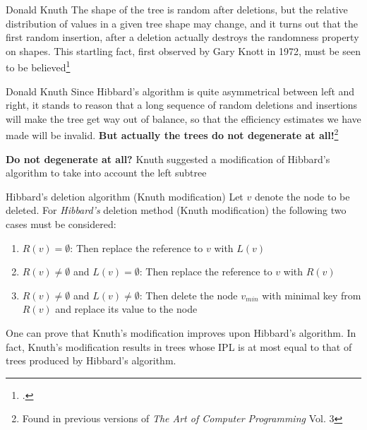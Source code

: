 \documentclass{beamer}
\begin{document}
\begin{frame}
    \begin{block}{Donald Knuth}
        The shape of the tree is random after deletions, but the relative distribution of values in a given tree shape may change, and it turns out that the first random insertion, after a deletion actually destroys the randomness property on shapes. This startling fact, first observed by Gary Knott in 1972, must be seen to be believed\footcite{knuth1998art}
    \end{block}

    \pause
    \begin{block}{Donald Knuth}
        Since Hibbard's algorithm is quite asymmetrical between left and right, it stands to reason that a long sequence of random deletions and insertions will make the tree get way out of balance, so that the efficiency estimates we have made will be invalid. \textbf{But actually the trees do not degenerate at all!}\footnote{Found in previous versions of \textit{The Art of Computer Programming} Vol. 3}
    \end{block}
\end{frame}

\begin{frame}
    \textbf{Do not degenerate at all?}
    \pause
    Knuth suggested a modification of Hibbard's algorithm to take into account the left subtree
    \begin{block}{Hibbard's deletion algorithm (Knuth modification)}
        Let $v$ denote the node to be deleted. For \textit{Hibbard's} deletion method (Knuth modification) the following two cases must be considered:
        \begin{enumerate}
            \item $R(v) = \emptyset$: Then replace the reference to $v$ with $L(v)$
            \item $R(v) \neq \emptyset$ and $L(v) = \emptyset$: Then replace the reference to $v$ with $R(v)$
            \item $R(v) \neq \emptyset$ and $L(v) \neq \emptyset$: Then delete the node $v_{min}$ with minimal key from $R(v)$ and replace its value to the node
        \end{enumerate}
    \end{block}
    \pause
    One can prove that Knuth's modification improves upon Hibbard's algorithm. In fact, Knuth's modification results in trees whose IPL is at most equal to that of trees produced by Hibbard's algorithm.
\end{frame}
\end{document}
